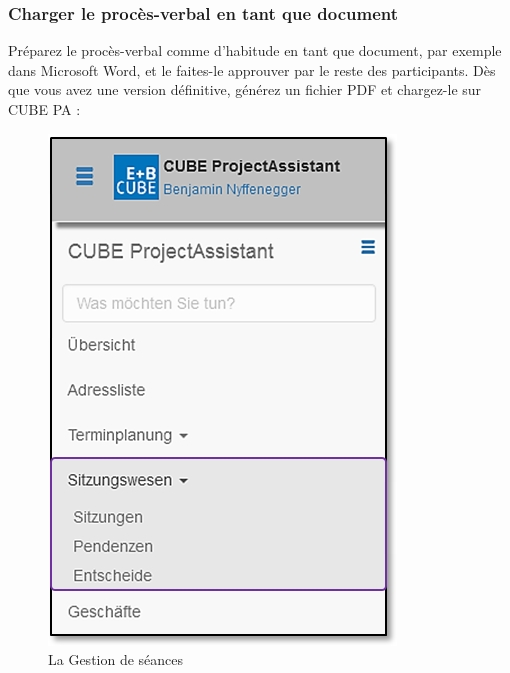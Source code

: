 \subsubsection{Charger le procès-verbal en tant que document}

Préparez le procès-verbal comme d'habitude en tant que document, par exemple dans Microsoft Word, et le faites-le approuver par le reste des participants. Dès que vous avez une version définitive, générez un fichier PDF et chargez-le sur CUBE PA :

\vspace{\baselineskip}

\begin{figure}   %
  \vspace{-35pt}      %
  \begin{center}
    \includegraphics[width=1\linewidth]{../chapters/05_Sitzungswesen/pictures/5-1_Menu_Sitzungswesen.jpg}
  \end{center}
  \vspace{-20pt}
  \caption{La Gestion de séances}
  \vspace{-10pt}
\end{figure}

